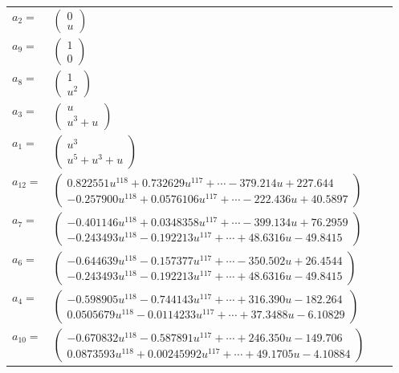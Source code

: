 \documentclass[1p]{elsarticle_modified}
\theoremstyle{definition}
\begin{document}
\begin{tabular}{m{7pt} m{180pt} m{7pt} m{180pt} }
\flushright $a_{2}=$&$\begin{pmatrix}0\\u\end{pmatrix}$ \\
\flushright $a_{9}=$&$\begin{pmatrix}1\\0\end{pmatrix}$ \\
\flushright $a_{8}=$&$\begin{pmatrix}1\\u^2\end{pmatrix}$ \\
\flushright $a_{3}=$&$\begin{pmatrix}u\\u^3+u\end{pmatrix}$ \\
\flushright $a_{1}=$&$\begin{pmatrix}u^3\\u^5+u^3+u\end{pmatrix}$ \\
\flushright $a_{12}=$&$\begin{pmatrix}0.822551 u^{118}+0.732629 u^{117}+\cdots-379.214 u+227.644\\-0.257900 u^{118}+0.0576106 u^{117}+\cdots-222.436 u+40.5897\end{pmatrix}$ \\
\flushright $a_{7}=$&$\begin{pmatrix}-0.401146 u^{118}+0.0348358 u^{117}+\cdots-399.134 u+76.2959\\-0.243493 u^{118}-0.192213 u^{117}+\cdots+48.6316 u-49.8415\end{pmatrix}$ \\
\flushright $a_{6}=$&$\begin{pmatrix}-0.644639 u^{118}-0.157377 u^{117}+\cdots-350.502 u+26.4544\\-0.243493 u^{118}-0.192213 u^{117}+\cdots+48.6316 u-49.8415\end{pmatrix}$ \\
\flushright $a_{4}=$&$\begin{pmatrix}-0.598905 u^{118}-0.744143 u^{117}+\cdots+316.390 u-182.264\\0.0505679 u^{118}-0.0114233 u^{117}+\cdots+37.3488 u-6.10829\end{pmatrix}$ \\
\flushright $a_{10}=$&$\begin{pmatrix}-0.670832 u^{118}-0.587891 u^{117}+\cdots+246.350 u-149.706\\0.0873593 u^{118}+0.00245992 u^{117}+\cdots+49.1705 u-4.10884\end{pmatrix}$ \\

\end{tabular}
\end{document}
